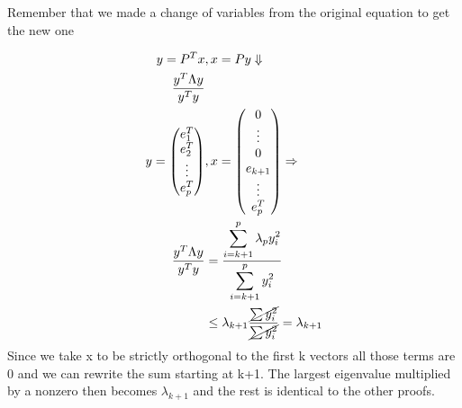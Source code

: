 Remember that we made a change of variables from the original equation to get the new one

\begin{align*}
    y = P^Tx &, x=Py \Downarrow\\
    \frac{y^T\Lambda y}{y^Ty}\\
    y= \begin{pmatrix}
    e^T_1 \\
    e^T_2 \\
    \vdots \\
    e^T_p \\
    \end{pmatrix} &, x= 
    \begin{pmatrix}
    0 \\
    \vdots \\
    0 \\
    e_{k+1} \\
    \vdots \\
    e^T_p \\
    \end{pmatrix} \Rightarrow \\
    \frac{y^T\Lambda y}{y^Ty} &= \frac{\displaystyle\sum_{i=k+1}^{p} \lambda_py^2_i}{\displaystyle\sum_{i=k+1}^{p} y_i^2} \\
&\leq \lambda_{k+1}\frac{\cancel{\sum y^2_i}}{\cancel{\sum y^2_i}} =\lambda_{k+1}
\end{align*}
Since we take x to be strictly orthogonal to the first k vectors all those terms are 0 and we can rewrite the sum starting at k+1. The largest eigenvalue multiplied by a nonzero then becomes $\lambda_{k+1}$ and the rest is identical to the other proofs.